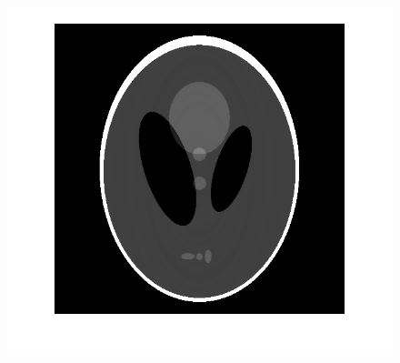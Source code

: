 \documentclass[hyperref]{ctexart}
\begin{document}
{\begin{figure}[htbp]
{				\includegraphics[scale=0.2]{33.png}
			}
			\quad
			\quad
			\subfigure[pic5.]{
}
\end{figure}}
\end{document}
